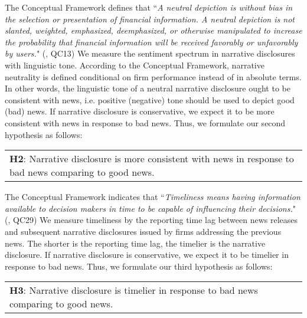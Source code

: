 \documentclass[a4paper]{article}
\begin{document}
\begin{spacing}{2}
The Conceptual Framework defines that ``\textit{A neutral depiction is without bias in the selection or presentation of financial information. A neutral depiction is not slanted, weighted, emphasized, deemphasized, or otherwise manipulated to increase the probability that financial information will be received favorably or unfavorably by users.}" (\cite{fasbConceptualFrameworkFinancial2018}, QC13) We measure the sentiment spectrum in narrative disclosures with linguistic tone. According to the Conceptual Framework, narrative neutrality is defined conditional on firm performance instead of in absolute terms. In other words, the linguistic tone of a neutral narrative disclosure ought to be consistent with news, i.e. positive (negative) tone should be used to depict good (bad) news. If narrative disclosure is conservative, we expect it to be more consistent with news in response to bad news. Thus, we formulate our second hypothesis as follows:

\begin{center}
	\begin{tabular}{l}
		\textbf{H2}: Narrative disclosure is more consistent with news in response to bad news comparing to good news.
	\end{tabular}
\end{center}

The Conceptual Framework indicates that ``\textit{Timeliness means having information available to decision makers in time to be capable of influencing their decisions.}" (\cite{fasbConceptualFrameworkFinancial2018}, QC29) We measure timeliness by the reporting time lag between news releases and subsequent narrative disclosures issued by firms addressing the previous news. The shorter is the reporting time lag, the timelier is the narrative disclosure. If narrative disclosure is conservative, we expect it to be timelier in response to bad news. Thus, we formulate our third hypothesis as follows:

\begin{center}
	\begin{tabular}{l}
		\textbf{H3}: Narrative disclosure is timelier in response to bad news comparing to good news.
	\end{tabular}
\end{center}


\end{spacing}
\end{document}
